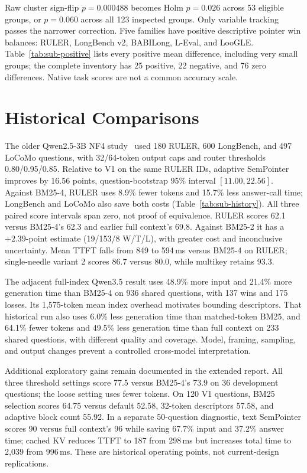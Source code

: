 \documentclass[runningheads]{llncs}
\begin{document}
Raw cluster sign-flip $p=0.000488$ becomes Holm $p=0.026$ across 53 eligible groups, or $p=0.060$ across all 123 inspected groups. Only variable tracking passes the narrower correction. Five families have positive descriptive pointer win balances: RULER, LongBench v2, BABILong, L-Eval, and LooGLE. Table~\ref{tab:sub-positive} lists every positive mean difference, including very small groups; the complete inventory has 25 positive, 22 negative, and 76 zero differences. Native task scores are not a common accuracy scale.


\section{Historical Comparisons}

The older Qwen2.5-3B NF4 study~\cite{qwen2025qwen25} used 180 RULER, 600 LongBench, and 497 LoCoMo questions, with 32/64-token output caps and router thresholds 0.80/0.95/0.85. Relative to V1 on the same RULER IDs, adaptive SemPointer improves by 16.56 points, question-bootstrap 95\% interval $[11.00,22.56]$. Against BM25-4, RULER uses 8.9\% fewer tokens and 15.7\% less answer-call time; LongBench and LoCoMo also save both costs (Table~\ref{tab:sub-history}). All three paired score intervals span zero, not proof of equivalence. RULER scores 62.1 versus BM25-4's 62.3 and earlier full context's 69.8. Against BM25-2 it has a $+2.39$-point estimate (19/153/8 W/T/L), with greater cost and inconclusive uncertainty. Mean TTFT falls from 849 to 594\,ms versus BM25-4 on RULER; single-needle variant 2 scores 86.7 versus 80.0, while multikey retains 93.3.

The adjacent full-index Qwen3.5 result uses 48.9\% more input and 21.4\% more generation time than BM25-4 on 936 shared questions, with 137 wins and 175 losses. Its 1,575-token mean index overhead motivates bounding descriptors. That historical run also uses 6.0\% less generation time than matched-token BM25, and 64.1\% fewer tokens and 49.5\% less generation time than full context on 233 shared questions, with different quality and coverage. Model, framing, sampling, and output changes prevent a controlled cross-model interpretation.

Additional exploratory gains remain documented in the extended report. All three threshold settings score 77.5 versus BM25-4's 73.9 on 36 development questions; the loose setting uses fewer tokens. On 120 V1 questions, BM25 selection scores 64.75 versus default 52.58, 32-token descriptors 57.58, and adaptive block count 55.92. In a separate 50-question diagnostic, text SemPointer scores 90 versus full context's 96 while saving 67.7\% input and 37.2\% answer time; cached KV reduces TTFT to 187 from 298\,ms but increases total time to 2,039 from 996\,ms. These are historical operating points, not current-design replications.
\end{document}
